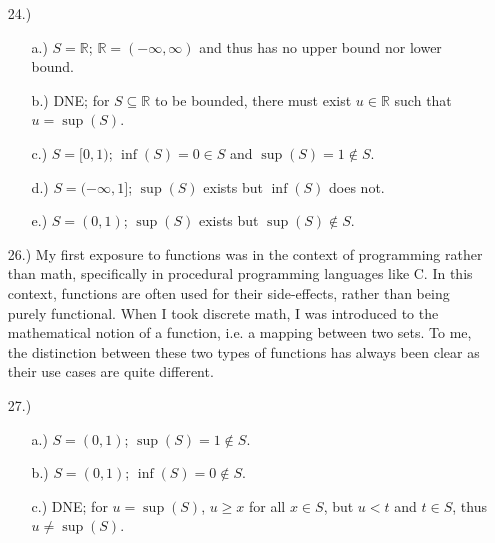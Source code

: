 \documentclass[12pt]{article}
\begin{document}
\begin{itemize}
    \item [24.)] \begin{itemize}
        \item [a.)] $S=\mathbb{R}$; $\mathbb{R}=(-\infty,\infty)$ and thus has no upper bound nor lower bound.

        \item [b.)] DNE; for $S\subseteq\mathbb{R}$ to be bounded, there must exist $u\in\mathbb{R}$ such that $u=\sup(S)$.

        \item [c.)] $S=[0,1)$; $\inf(S)=0\in S$ and $\sup(S)=1\notin S$.

        \item [d.)] $S=(-\infty,1]$; $\sup(S)$ exists but $\inf(S)$ does not.

        \item [e.)] $S=(0,1)$; $\sup(S)$ exists but $\sup(S)\notin S$.
    \end{itemize}


    \pagebreak
    \item [26.)] My first exposure to functions was in the context of programming rather than math, specifically in procedural programming languages like C. In this context, functions are often used for their side-effects, rather than being purely functional. When I took discrete math, I was introduced to the mathematical notion of a function, i.e. a mapping between two sets. To me, the distinction between these two types of functions has always been clear as their use cases are quite different.

    \item [27.)] \begin{itemize}
        \item [a.)] $S=(0,1)$; $\sup(S)=1\notin S$.

        \item [b.)] $S=(0,1)$; $\inf(S)=0\notin S$.

        \item [c.)] DNE; for $u=\sup(S)$, $u\geq x$ for all $x\in S$, but $u<t$ and $t\in S$, thus $u\neq\sup(S)$.
    \end{itemize}




\end{itemize}
\end{document}
